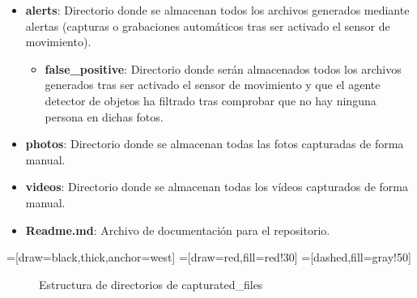 \begin{itemize}
\item \textbf{alerts}: Directorio donde se almacenan todos los archivos generados mediante alertas (capturas o grabaciones automáticos tras ser activado el sensor de movimiento).

	\begin{itemize}
	\item \textbf{false\_positive}: Directorio donde serán almacenados todos los archivos generados tras ser activado el sensor de movimiento y que el agente detector de objetos ha filtrado tras comprobar que no hay ninguna persona en dichas fotos.
	\end{itemize}

\item \textbf{photos}: Directorio donde se almacenan todas las fotos capturadas de forma manual.

\item \textbf{videos}: Directorio donde se almacenan todas los vídeos capturados de forma manual.

\item \textbf{Readme.md}: Archivo de documentación para el repositorio.

\end{itemize}



=[draw=black,thick,anchor=west]
=[draw=red,fill=red!30]
=[dashed,fill=gray!50]

\begin{figure}[H]
\centering

\caption{Estructura de directorios de capturated\_files} \label{fig:tik1}
\end{figure}

